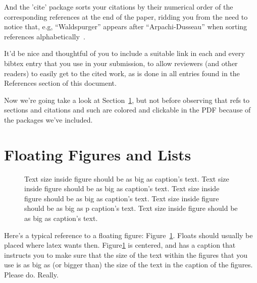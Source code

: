 \documentclass[letterpaper,twocolumn,10pt]{article}
\begin{document}
And the 'cite' package sorts your citations by their numerical order
of the corresponding references at the end of the paper, ridding you
from the need to notice that, e.g, ``Waldspurger'' appears after
``Arpachi-Dusseau'' when sorting references
alphabetically~\cite{waldspurger02,arpachiDusseau18:osbook}. 

It'd be nice and thoughtful of you to include a suitable link in each
and every bibtex entry that you use in your submission, to allow
reviewers (and other readers) to easily get to the cited work, as is
done in all entries found in the References section of this document.

Now we're going take a look at Section~\ref{sec:figs}, but not before
observing that refs to sections and citations and such are colored and
clickable in the PDF because of the packages we've included.

\section{Floating Figures and Lists}
\label{sec:figs}


\begin{figure}
\begin{center}
\end{center}
\caption{\label{fig:vectors} Text size inside figure should be as big as
  caption's text. Text size inside figure should be as big as
  caption's text. Text size inside figure should be as big as
  caption's text. Text size inside figure should be as big as
p  caption's text. Text size inside figure should be as big as
  caption's text. }
\end{figure}


Here's a typical reference to a floating figure:
Figure~\ref{fig:vectors}. Floats should usually be placed where latex
wants then. Figure\ref{fig:vectors} is centered, and has a caption
that instructs you to make sure that the size of the text within the
figures that you use is as big as (or bigger than) the size of the
text in the caption of the figures. Please do. Really.
\end{document}
